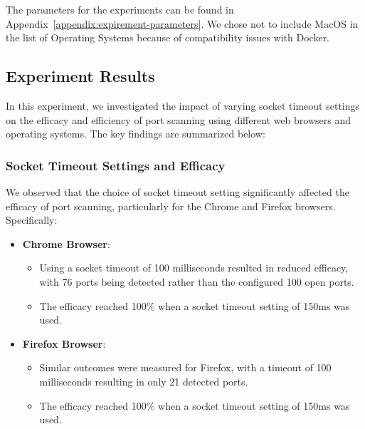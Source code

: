 The parameters for the experiments can be found in Appendix~\ref{appendix:expirement-parameters}. 
We chose not to include MacOS in the list of Operating Systems because of compatibility issues with Docker.




\subsection{Experiment Results}

In this experiment, we investigated the impact of varying socket timeout settings on the efficacy and efficiency of port scanning using different web browsers and operating systems. The key findings are summarized below:

\subsubsection{Socket Timeout Settings and Efficacy}

We observed that the choice of socket timeout setting significantly affected the efficacy of port scanning, particularly for the Chrome and Firefox browsers. Specifically:

\begin{itemize}
    \item \textbf{Chrome Browser}:
    \begin{itemize}
        \item Using a socket timeout of 100 milliseconds resulted in reduced efficacy, with 76 ports being detected rather than the configured 100 open ports.
        \item The efficacy reached 100\% when a socket timeout setting of 150ms was used.
    \end{itemize}
    
    \item \textbf{Firefox Browser}:
    \begin{itemize}
        \item Similar outcomes were measured for Firefox, with a timeout of 100 milliseconds resulting in only 21 detected ports.
        \item The efficacy reached 100\% when a socket timeout setting of 150ms was used.
    \end{itemize}
\end{itemize}

